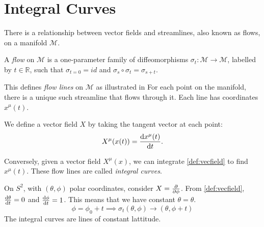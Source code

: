 \section{Integral Curves}%
\label{sec:integral_curves}

There is a relationship between vector fields and streamlines, also known as flows, on a manifold $\mathcal{M}$.

\begin{definition}[flow]
  A \emph{flow} on $\mathcal{M}$ is a one-parameter family of diffeomorphisms $\sigma_t: \mathcal{M} \to \mathcal{M}$, labelled by $t \in \mathbb{R}$, such that $\sigma_{t = 0} = id$ and $\sigma_s \circ \sigma_t = \sigma_{s + t}.$ 
\end{definition}
This defines \emph{flow lines} on $\mathcal{M}$ as illustrated in 
For each point on the manifold, there is a unique such streamline that flows through it.
Each line has coordinates $x^\mu(t)$.

\begin{definition}
We define a vector field $X$ by taking the tangent vector at each point:
 \begin{equation}
   \label{def:vecfield}
   X^\mu(x(t)) = \dv{x^\mu(t)}{t}.
\end{equation}
\end{definition}
\begin{definition}
  Conversely, given a vector field $X^\mu(x)$, we can integrate \eqref{def:vecfield} to find $x^\mu(t)$.
  These flow lines are called \emph{integral curves}.
\end{definition}

\begin{example}[]
  On $S^2$, with $(\theta, \phi)$ polar coordinates, consider $X = \pdv{}{\phi}$.
  From \eqref{def:vecfield}, $\dv{\theta}{t} = 0$ and $\dv{\phi}{t} = 1$. This means that we have constant $\theta = \theta$.
  \begin{equation}
    \phi = \phi_0 + t \implies \sigma_t (\theta, \phi) \rightarrow (\theta, \phi + t)
  \end{equation}
  The integral curves are lines of constant lattitude.
\end{example}
